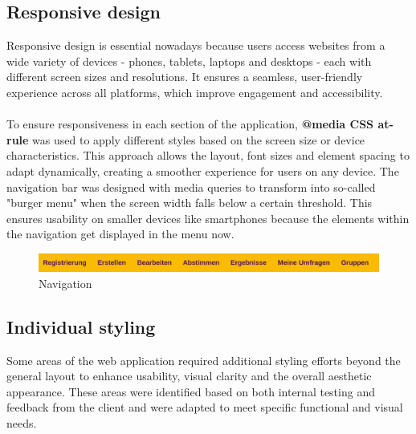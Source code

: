 \documentclass[a4paper,12pt]{report}
\begin{document}
\subsection{Responsive design}
Responsive design is essential nowadays because users access websites from a wide variety of devices - phones, tablets, laptops and desktops - each with different screen sizes and resolutions. It ensures a seamless, user-friendly experience across all platforms, which improve engagement and accessibility.\\ \\
To ensure responsiveness in each section of the application, \textbf{@media CSS at-rule} was used to apply different styles based on the screen size or device characteristics. This approach allows the layout, font sizes and element spacing to adapt dynamically, creating a smoother experience for users on any device. The navigation bar was designed with media queries to transform into so-called "burger menu" when the screen width falls below a certain threshold. This ensures usability on smaller devices like smartphones because the elements within the navigation get displayed in the menu now.
\begin{figure}[h!]
	\centering
	\includegraphics[width=1\textwidth]{pics/navigation.png}
	\caption{Navigation}
	\label{fig:navigation}
\end{figure}
\subsection{Individual styling}
Some areas of the web application required additional styling efforts beyond the general layout to enhance usability, visual clarity and the overall aesthetic appearance. These areas were identified based on both internal testing and feedback from the client and were adapted to meet specific functional and visual needs.
\end{document}
